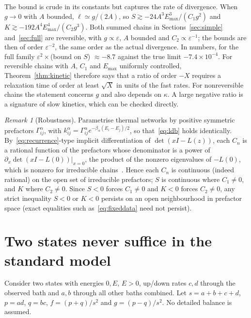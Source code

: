 \documentclass[11pt,a4paper]{article}
\theoremstyle{remark}\newtheorem{remark}[theorem]{Remark}
\newcommand{\eps}{\varepsilon}
\begin{document}
The bound is crude in its constants but captures the rate of divergence. When $g\to0$ with $A$ bounded, $\ell\simeq g/(2A)$, so $S\gtrsim-24A^3E_{\max}^3/(C_1g^2)$ and $K\gtrsim-192A^4E_{\max}^4/(C_2g^3)$. Both summed chains in Sections~\ref{sec:simple} and~\ref{sec:full} are reversible, with $g\propto\eps$, $A$ bounded and $C_2\propto\eps^{-1}$; the bounds are then of order $\eps^{-2}$, the same order as the actual divergence. In numbers, for the full family $\eps^2\times$(bound on $S$) $\approx-8.7$ against the true limit $-7.4\times10^{-4}$. For reversible chains with $A$, $C_1$ and $E_{\max}$ uniformly controlled, Theorem~\ref{thm:kinetic} therefore says that a ratio of order $-X$ requires a relaxation time of order at least $\sqrt X$ in units of the fast rates. For nonreversible chains the statement concerns $g$ and also depends on $\kappa$. A large negative ratio is a signature of slow kinetics, which can be checked directly.

\begin{remark}[Robustness]\label{rem:robust}
Parametrise thermal networks by positive symmetric prefactors $\Gamma^\alpha_{ij}$, with $k^\alpha_{ij}=\Gamma^\alpha_{ij}e^{-\beta_\alpha(E_i-E_j)/2}$, so that~\eqref{eq:ldb} holds identically. By~\eqref{eq:recurrence}-type implicit differentiation of $\det(xI-L(z))$, each $C_n$ is a rational function of the prefactors whose denominator is a power of $\partial_x\det(xI-L(0))|_{x=0}$, the product of the nonzero eigenvalues of $-L(0)$, which is nonzero for irreducible chains~\cite{Bruderer2014}. Hence each $C_n$ is continuous (indeed rational) on the open set of irreducible prefactors; $S$ is continuous where $C_1\ne0$, and $K$ where $C_2\ne0$. Since $S<0$ forces $C_1\ne0$ and $K<0$ forces $C_2\ne0$, any strict inequality $S<0$ or $K<0$ persists on an open neighbourhood in prefactor space (exact equalities such as~\eqref{eq:fixeddata} need not persist).
\end{remark}

\section{Two states never suffice in the standard model}\label{sec:minimal}
Consider two states with energies $0,E$, $E>0$, up/down rates $c,d$ through the observed bath and $a,b$ through all other baths combined. Let $s=a+b+c+d$, $p=ad$, $q=bc$, $f=(p+q)/s^2$ and $g=(p-q)/s^2$. No detailed balance is assumed.
\end{document}
